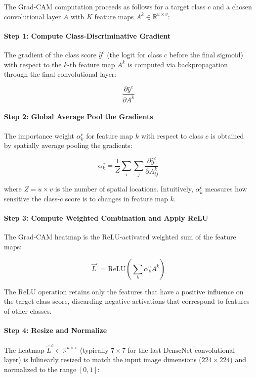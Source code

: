 The Grad-CAM computation proceeds as follows for a target class $c$ and a chosen convolutional layer $A$ with $K$ feature maps $A^k \in \mathbb{R}^{u \times v}$:

\paragraph{Step 1: Compute Class-Discriminative Gradient}
The gradient of the class score $\hat{y}^c$ (the logit for class $c$ before the final sigmoid) with respect to the $k$-th feature map $A^k$ is computed via backpropagation through the final convolutional layer:

\begin{equation}
	\frac{\partial \hat{y}^c}{\partial A^k}
	\label{eq:gradcam_gradient}
\end{equation}

\paragraph{Step 2: Global Average Pool the Gradients}
The importance weight $\alpha_k^c$ for feature map $k$ with respect to class $c$ is obtained by spatially average pooling the gradients:

\begin{equation}
	\alpha_k^c =
	\frac{1}{Z}
	\sum_i \sum_j
	\frac{\partial \hat{y}^c}{\partial A_{ij}^k}
	\label{eq:gradcam_alpha}
\end{equation}

where $Z = u \times v$ is the number of spatial locations. Intuitively, $\alpha_k^c$ measures how sensitive the class-$c$ score is to changes in feature map $k$.

\paragraph{Step 3: Compute Weighted Combination and Apply ReLU}
The Grad-CAM heatmap is the ReLU-activated weighted sum of the feature maps:

\begin{equation}
	\hat{L}^c = \mathrm{ReLU}\left(\sum_k \alpha_k^c A^k \right)
	\label{eq:gradcam_heatmap}
\end{equation}

The ReLU operation retains only the features that have a positive influence on the target class score, discarding negative activations that correspond to features of other classes.

\paragraph{Step 4: Resize and Normalize}
The heatmap $\hat{L}^c \in \mathbb{R}^{u \times v}$ (typically $7 \times 7$ for the last DenseNet convolutional layer) is bilinearly resized to match the input image dimensions ($224 \times 224$) and normalized to the range $[0,1]$:


